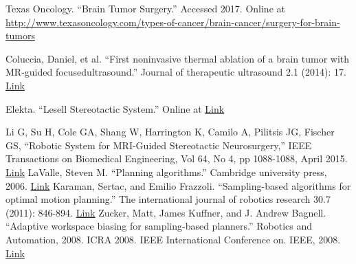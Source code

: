 \documentclass[12pt]{report}
\begin{document}
%
%
%
\begin{thebibliography}{99}

 Texas Oncology. ``Brain Tumor Surgery.'' Accessed 2017. Online at \url{http://www.texasoncology.com/types-of-cancer/brain-cancer/surgery-for-brain-tumors}

 Coluccia, Daniel, et al. ``First noninvasive thermal ablation of a brain tumor with MR-guided focusedultrasound.'' Journal of therapeutic ultrasound 2.1 (2014): 17. \href{https://jtultrasound.biomedcentral.com/articles/10.1186/2050-5736-2-17}{Link}

 Elekta. ``Lesell Stereotactic System.'' Online at \href{https://www.elekta.com/neurosurgery/leksell-stereotactic-system.html}{Link}

 Li G, Su H, Cole GA, Shang W, Harrington K, Camilo A, Pilitsis JG, Fischer GS, ``Robotic System for MRI-Guided Stereotactic Neurosurgery,'' IEEE Transactions on Biomedical Engineering, Vol 64, No 4, pp 1088-1088, April 2015. \href{http://aimlab.wpi.edu/includes/publications/2014_TBME_Li_Fischer_RoboticSystemforMRIGuidedStereotacticNeurosurgery.pdf}{Link}
 LaValle, Steven M. ``Planning algorithms.'' Cambridge university press, 2006. \href{http://citeseerx.ist.psu.edu/viewdoc/download?doi=10.1.1.225.1874&rep=rep1&type=pdf}{Link}
 Karaman, Sertac, and Emilio Frazzoli. ``Sampling-based algorithms for optimal motion planning.'' The international journal of robotics research 30.7 (2011): 846-894. \href{http://citeseerx.ist.psu.edu/viewdoc/download?doi=10.1.1.419.5503&rep=rep1&type=pdf}{Link}
 Zucker, Matt, James Kuffner, and J. Andrew Bagnell. ``Adaptive workspace biasing for sampling-based planners.'' Robotics and Automation, 2008. ICRA 2008. IEEE International Conference on. IEEE, 2008. \href{http://www.ri.cmu.edu/pub_files/pub4/zucker_matthew_2008_1/zucker_matthew_2008_1.pdf}{Link}


\end{thebibliography}
\end{document}
